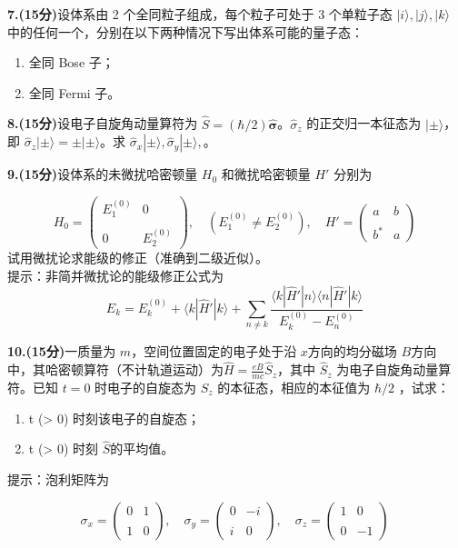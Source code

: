 \textbf{7.(15分)}设体系由 2 个全同粒子组成，每个粒子可处于 3 个单粒子态 $|i\rangle, |j\rangle, |k\rangle$ 中的任何一个，分别在以下两种情况下写出体系可能的量子态：
\begin{enumerate}
    \item 全同 Bose 子；
    \item 全同 Fermi 子。
\end{enumerate}

\textbf{8.(15分)}设电子自旋角动量算符为 $\hat{S} = (\hbar/2) \hat{\mathbf{\sigma}}$。$\hat{\sigma}_z$ 的正交归一本征态为 $|\pm\rangle$，即 $\hat{\sigma}_z|\pm\rangle = \pm|\pm\rangle$。求 $\hat{\sigma}_x|\pm\rangle, \hat{\sigma}_y|\pm\rangle, $。

\textbf{9.(15分)}设体系的未微扰哈密顿量 $H_0$ 和微扰哈密顿量 $H'$ 分别为

\begin{equation}
H_0 = \begin{pmatrix} E_1^{(0)} & 0 \\\\ 0 & E_2^{(0)} \end{pmatrix}, \quad (E_1^{(0)} \neq E_2^{(0)}), \quad H' = \begin{pmatrix} a & b \\\\ b^* & a \end{pmatrix}~
\end{equation}
试用微扰论求能级的修正（准确到二级近似）。\\
提示：非简并微扰论的能级修正公式为\\
\begin{equation}
E_k = E_k^{(0)} + \langle k | \hat H' | k \rangle + \sum_{n \neq k} \frac{\langle k | \hat H' | n \rangle \langle n |\hat H' | k \rangle}{E_k^{(0)} - E_n^{(0)}}~
\end{equation}

\textbf{10.(15分)}一质量为 $m$，空间位置固定的电子处于沿 $x$方向的均分磁场 $ B$方向 中，其哈密顿算符（不计轨道运动）为$\hat{H} = \frac{eB}{mc} \hat{S}_z $，其中 $\hat{S}_z$ 为电子自旋角动量算符。已知 $t = 0$ 时电子的自旋态为 $S_z$ 的本征态，相应的本征值为 $\hbar/2$ ，试求：
\begin{enumerate}
    \item  t (> 0) 时刻该电子的自旋态；
    \item  t (> 0) 时刻 $\hat{S}$的平均值。
\end{enumerate}

提示：泡利矩阵为

$$\sigma_x = \begin{pmatrix}0 & 1 \\\\1 & 0\end{pmatrix}, \quad\sigma_y = \begin{pmatrix}0 & -i \\\\i & 0\end{pmatrix}, \quad\sigma_z = \begin{pmatrix}1 & 0 \\\\0 & -1\end{pmatrix}~$$